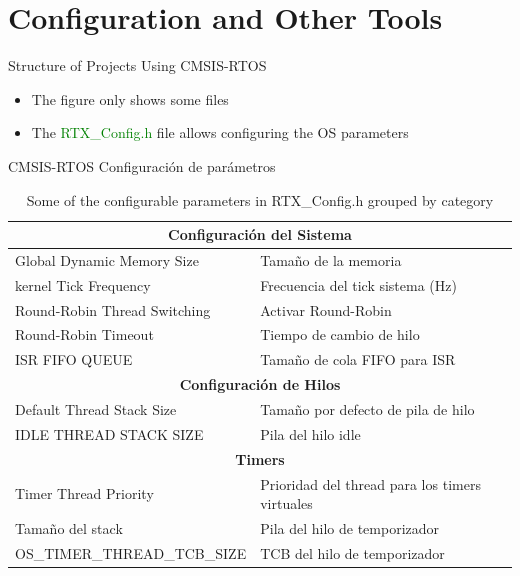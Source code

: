 \section{Configuration and Other Tools}
\begin{frame}{Structure of Projects Using CMSIS-RTOS}
\begin{itemize}
    \item The figure only shows some files
    \item The \textcolor{green}{RTX\_Config.h} file allows configuring the OS parameters
\end{itemize}
\end{frame}

\begin{frame}{CMSIS-RTOS Configuración de parámetros}

\begin{table}[H]
\centering
\begin{tabular}{|l|l|}
\hline
\multicolumn{2}{|c|}{\textbf{Configuración del Sistema}} \\
\hline
Global Dynamic Memory Size & Tamaño de la memoria\\
kernel Tick Frequency & Frecuencia del tick sistema (Hz) \\
Round-Robin Thread Switching & Activar Round-Robin \\
Round-Robin Timeout & Tiempo de cambio de hilo \\
ISR FIFO QUEUE & Tamaño de cola FIFO para ISR \\
\hline
\multicolumn{2}{|c|}{\textbf{Configuración de Hilos}} \\
\hline
Default Thread Stack Size & Tamaño por defecto de pila de hilo \\
IDLE THREAD STACK SIZE & Pila del hilo idle \\
\hline
\multicolumn{2}{|c|}{\textbf{Timers}} \\
\hline
Timer Thread Priority & Prioridad del thread para los timers virtuales \\
Tamaño del stack & Pila del hilo de temporizador \\
OS\_TIMER\_THREAD\_TCB\_SIZE & TCB del hilo de temporizador \\
\hline
\end{tabular}
\caption{Some of the configurable parameters in RTX\_Config.h grouped by category}
\end{table}

\end{frame}

